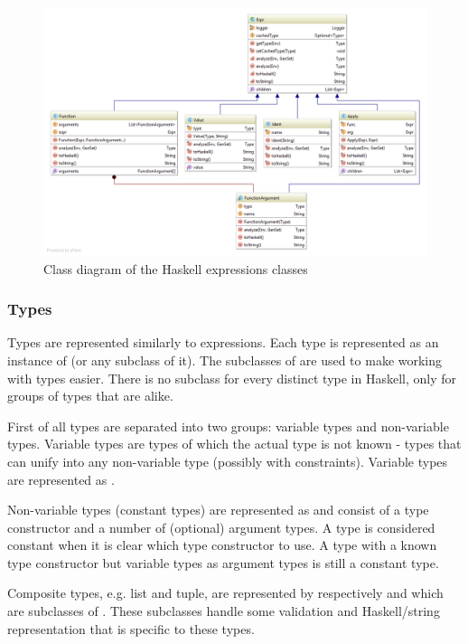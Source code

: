 \begin{figure}[h]
\centering
\includegraphics[scale=0.4]{Images/classdiagram-expr}
\caption{Class diagram of the Haskell expressions classes}
\label{fig:classdiagram-expr}
\end{figure}

\subsubsection{Types}

Types are represented similarly to expressions.
Each type is represented as an instance of  (or any subclass of it).
The subclasses of  are used to make working with types easier.
There is no subclass for every distinct type in Haskell, only for groups of types that are alike.

First of all types are separated into two groups: variable types and non-variable types.
Variable types are types of which the actual type is not known - types that can unify into any non-variable type (possibly with constraints).
Variable types are represented as .

Non-variable types (constant types) are represented as  and consist of a type constructor and a number of (optional) argument types.
A type is considered constant when it is clear which type constructor to use. A type with a known type constructor but variable types as argument types is still a constant type.

Composite types, e.g. list and tuple, are represented by respectively  and  which are subclasses of .
These subclasses handle some validation and Haskell/string representation that is specific to these types.


